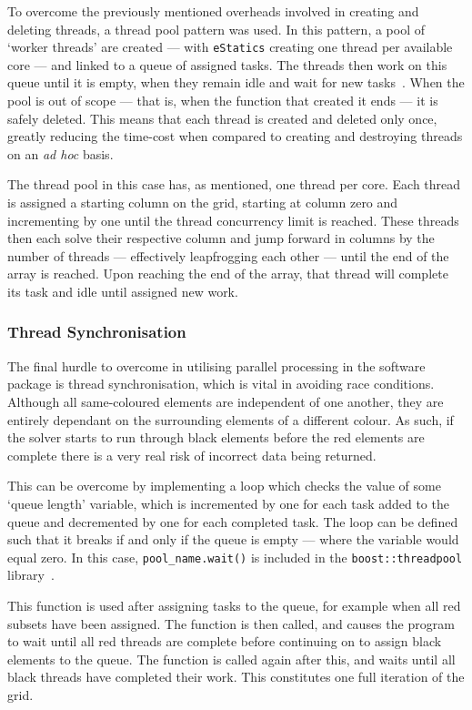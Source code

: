 			To overcome the previously mentioned overheads involved in creating and deleting threads, a thread pool pattern was used. In this pattern, a pool of `worker threads' are created --- with \lstinline|eStatics| creating one thread per available core --- and linked to a queue of assigned tasks. The threads then work on this queue until it is empty, when they remain idle and wait for new tasks~\cite{goetz}. When the pool is out of scope --- that is, when the function that created it ends --- it is safely deleted. This means that each thread is created and deleted only once, greatly reducing the time-cost when compared to creating and destroying threads on an \textit{ad hoc} basis.
			
			The thread pool in this case has, as mentioned, one thread per core. Each thread is assigned a starting column on the grid, starting at column zero and incrementing by one until the thread concurrency limit is reached. These threads then each solve their respective column and jump forward in columns by the number of threads --- effectively leapfrogging each other --- until the end of the array is reached. Upon reaching the end of the array, that thread will complete its task and idle until assigned new work.
			
		\subsubsection{Thread Synchronisation}
		
			The final hurdle to overcome in utilising parallel processing in the software package is thread synchronisation, which is vital in avoiding race conditions. Although all same-coloured elements are independent of one another, they are entirely dependant on the surrounding elements of a different colour. As such, if the solver starts to run through black elements before the red elements are complete there is a very real risk of incorrect data being returned.
			
			This can be overcome by implementing a loop which checks the value of some `queue length' variable, which is incremented by one for each task added to the queue and decremented by one for each completed task. The loop can be defined such that it breaks if and only if the queue is empty --- where the variable would equal zero. In this case, \lstinline|pool_name.wait()| is included in the \lstinline|boost::threadpool| library~\cite{threadpool}.
			
			This function is used after assigning tasks to the queue, for example when all red subsets have been assigned. The function is then called, and causes the program to wait until all red threads are complete before continuing on to assign black elements to the queue. The function is called again after this, and waits until all black threads have completed their work. This constitutes one full iteration of the grid.
	
